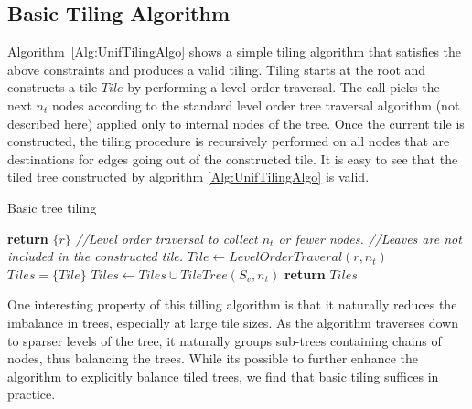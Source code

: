 \subsection{Basic Tiling Algorithm}
\label{sec:UnifTiling}
Algorithm~\ref{Alg:UnifTilingAlgo} shows a simple tiling algorithm that satisfies the above constraints and produces a valid tiling. 
Tiling starts at the root and constructs a tile $Tile$ by performing
a level order traversal. The call  picks the next $n_t$ nodes according to the standard level order tree traversal algorithm (not described here) applied only to internal nodes of the tree. Once the current tile is constructed, the tiling procedure is recursively performed on all nodes that are 
destinations for edges going out of the constructed tile.
It is easy to see that the tiled tree constructed by algorithm \ref{Alg:UnifTilingAlgo} is valid.
\begin{algorithm}
  \caption{Basic tree tiling}
  \label{Alg:UnifTilingAlgo}
  \begin{algorithmic}
              \State \textbf{return} $\{ r \}$
          \EndIf
          \State \textcolor{codegreen}{\textit{//Level order traversal to collect $n_t$ or fewer nodes. }}
          \State \textcolor{codegreen}{\textit{//Leaves are not included in the constructed tile. }}
          \State $Tile \leftarrow LevelOrderTraveral(r, n_t)$
          \State $Tiles =  \{ Tile \}$
              \State $Tiles \leftarrow Tiles \cup TileTree(S_v, n_t)$
          \EndFor
          \State \textbf{return} $Tiles$
      \EndProcedure
  \end{algorithmic}
\end{algorithm}

One interesting property of this tilling algorithm is that it naturally reduces the imbalance in trees, especially at large tile sizes. As the algorithm traverses down to sparser levels of the tree, it naturally groups sub-trees containing chains of nodes, thus balancing the trees. While its possible to further enhance the algorithm to explicitly balance tiled trees, we find that basic tiling suffices in practice.

